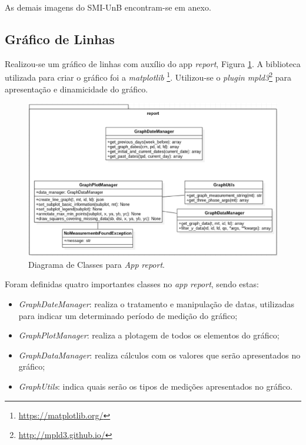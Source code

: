 As demais imagens do SMI-UnB encontram-se em anexo.

\subsection{Gráfico de Linhas}
Realizou-se um gráfico de linhas com auxílio do app \textit{report}, Figura \ref{app_report}. A biblioteca utilizada para criar o gráfico foi a \textit{matplotlib} \footnote{\url{https://matplotlib.org/}}. Utilizou-se o \textit{plugin} \textit{mpld3}\footnote{\url{http://mpld3.github.io/}} para apresentação e dinamicidade do gráfico.

\begin{figure}[!h]
    \centering
    \includegraphics[keepaspectratio=true,scale=0.6]{figuras/app_report.eps}
    \caption{Diagrama de Classes para \textit{App} \textit{report}.}
    \label{app_report}
\end{figure}

Foram definidas quatro importantes classes no \textit{app} \textit{report}, sendo estas:

\begin{itemize}
    \item \textit{GraphDateManager}: realiza o tratamento e manipulação de datas, utilizadas para indicar um determinado período de medição do gráfico;
    \item \textit{GraphPlotManager}: realiza a plotagem de todos os elementos do gráfico;
    \item \textit{GraphDataManager}: realiza cálculos com os valores que serão apresentados no gráfico;
    \item \textit{GraphUtils}: indica quais serão os tipos de medições apresentados no gráfico.
\end{itemize}

